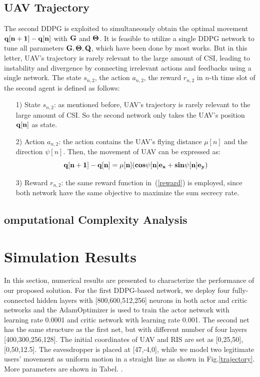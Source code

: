 \documentclass[journal]{IEEEtran}
\begin{document}
\subsection{UAV Trajectory}
The second DDPG is exploited to simultaneously obtain the optimal movement $\bf{q}[n+1]-\bf{q}[n]$ with $\bf{G}$ and $\bf{\Theta}$. It is feasible to utilize a single DDPG network to tune all parameters $\bf{G}, \bf{\Theta}, \bf{Q}$, which have been done by most works. But in this letter, UAV's trajectory is rarely relevant to the large amount of CSI, leading to instability and divergence by connecting irrelevant actions and feedbacks using a single network. The state $s_{n,2}$, the action $a_{n,2}$, the reward $r_{n,2}$ in $n$-th time slot of the second agent is defined as follows:
\begin{itemize}
  \item [1)] 
  State $s_{n,2}$: as mentioned before, UAV's trajectory is rarely relevant to the large amount of CSI. So the second network only takes the UAV's position $\bf{q}[n]$ as state.
  \item [2)]
  Action $a_{n,2}$: the action contains the UAV's flying distance $\mu[n] $ and the direction $\psi[n] $. Then, the movement of UAV can be expressed as:
  \begin{equation}
    \bf{q}[n+1]-\bf{q}[n]=\mu[n](cos\psi[n] \bf{e}_x+ sin\psi[n] \bf{e}_y)
  \end{equation}
  \item [3)]
  Reward $r_{n,2}$: the same reward function in~(\ref{reward}) is employed, since both network have the same objective to maximize the sum secrecy rate.
\end{itemize}

\subsection{omputational Complexity Analysis}

\section{Simulation Results}
In this section, numerical results are presented to characterize the performance of our proposed solution. For the first DDPG-based network, we deploy four fully-connected hidden layers with [800,600,512,256] neurons in both actor and critic networks and the AdamOptimizer is used to train the actor network with learning rate 0.0001 and critic network with learning rate 0.001. The second net has the same structure as the first net, but with different number of four layers [400,300,256,128]. The initial coordinates of UAV and RIS are set as [0,25,50], [0,50,12.5]. The eavesdropper is placed at [47,-4,0], while we model two legitimate users' movement as uniform motion in a straight line as shown in Fig.\ref{trajectory}. More parameters are shown in Tabel. \uppercase\expandafter{}.
\end{document}
